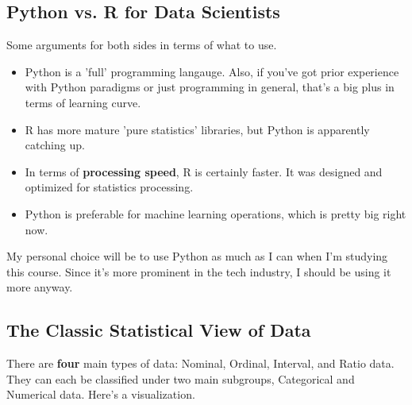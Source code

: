 \documentclass[english, 10pt]{article}
\begin{document}
\subsection{Python vs. R for Data Scientists}

Some arguments for both sides in terms of what to use.

\begin{itemize}
	\item Python is a 'full' programming langauge. Also, if you've got prior experience with Python paradigms or just programming in general, that's a big plus in terms of learning curve.
	\item R has more mature 'pure statistics' libraries, but Python is apparently catching up.
	\item In terms of \textbf{processing speed}, R is certainly faster. It was designed and optimized for statistics processing.
	\item Python is preferable for machine learning operations, which is pretty big right now.
\end{itemize}

My personal choice will be to use Python as much as I can when I'm studying this course. Since it's more prominent in the tech industry, I should be using it more anyway.

\subsection{The Classic Statistical View of Data}

There are \textbf{four} main types of data: Nominal, Ordinal, Interval, and Ratio data. They can each be classified under two main subgroups, Categorical and Numerical data. Here's a visualization.\\
\end{document}
